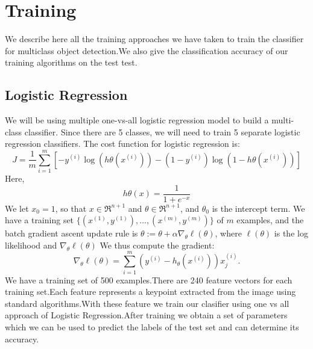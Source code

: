 \documentclass[11pt,twocolumn,letterpaper]{article}
\begin{document}
\section{Training}
We describe here all the training approaches we have taken to train the classifier for multiclass object detection.We also give the classification accuracy of our training algorithms on the test test.
\subsection{Logistic Regression}
We will be using multiple one-vs-all logistic regression model to build a
multi-class classifier. Since there are 5
classes, we will need to train 5 separate logistic regression classifiers.
The cost function for logistic regression is:$$J=\frac{1}{m}\sum\limits_{i=1}^m[-y^{(i)}\log(h\theta(x^{(i)}))-(1-y^{(i)})\log(1-h\theta(x^{(i)}))]$$
Here,
$$ h\theta(x)=\frac{1}{1 + e^{-x}} $$
We let $ x_0=1 $, so that $x \in \Re^{n+1}$
and $ \theta \in \Re^{n+1} $, and $ \theta_0 $ is the intercept term.  We have a training set
$ \{(x^{(1)}, y^{(1)}), \ldots, (x^{(m)}, y^{(m)})\} $ of $m$ examples, and the batch gradient
ascent update rule is $ \theta := \theta + \alpha \nabla_\theta \ell(\theta) $, where $ \ell(\theta) $
is the log likelihood and $ \nabla_\theta \ell(\theta)$
We thus compute the gradient:
$$
\nabla_\theta \ell(\theta) = \sum_{i=1}^m \left(y^{(i)} - h_\theta(x^{(i)}) \right) x^{(i)}_j.
$$
We have a training set of 500 examples.There are 240 feature vectors for each training set.Each feature represents a keypoint extracted from the image using standard algorithms.With these feature we train our clasifier using one vs all approach of Logistic Regression.After training we obtain a set of parameters which we can be used to predict the labels of the test set and can determine its accuracy.
\end{document}
